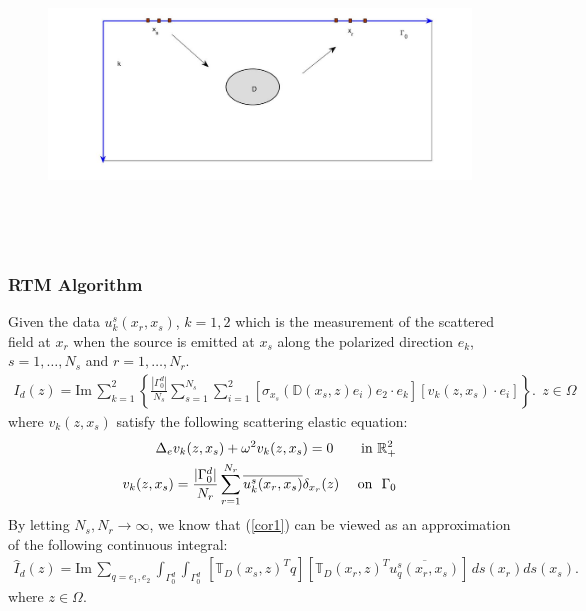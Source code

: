 \documentclass[utf-8,8pt]{beamer}
\newcommand{\R}{\mathbb{R}}
\renewcommand{\Im}{\mathrm{Im}\,}
\newcommand{\Ga}{\Gamma}
\newcommand{\Om}{\Omega}
\renewcommand{\Im}{\mathrm{Im}\,}
\newcommand{\D}{\mathbb{D}}
\newcommand{\T}{\mathbb{T}}
\newcommand{\be}{\begin{eqnarray}}
\newcommand{\ee}{\end{eqnarray}}
\newcommand{\ben}{\begin{eqnarray*}}
\newcommand{\een}{\end{eqnarray*}}
\begin{document}
\begin{frame}
\begin{figure}
  \centering
  \includegraphics[width=12cm,height=8cm]{./figure/half_forward}
\end{figure}
\end{frame}
\begin{frame}
\frametitle{RTM Algorithm}
Given the data $u_k^s(x_r,x_s)$, $k=1,2$ which is the measurement of the scattered field at $x_r$ when the source is emitted at $x_s$ along the  polarized direction $e_k$, $s=1,\dots, N_s$ and $r=1,\dots,N_r$.
\be\label{cor1}
I_d(z)=\Im\sum_{k=1}^{2}\left\{\frac{|\Gamma_0^d|}{N_s}\sum^{N_s}_{s=1}\sum_{i=1}^{2}[\sigma_{x_s}(\D(x_s,z)e_i)e_2\cdot e_k][v_k(z,x_s)\cdot e_i]\right\}. \ \ z\in \Omega
\ee
where $v_k(z,x_s)$ satisfy the following scattering elastic equation:
\ben
\Delta_e v_k(z,x_s) + \omega^2 v_k(z,x_s) =0 \qquad\mbox{\rm in } \R^2_+ \\
v_k(z,x_s)=\frac{|\Ga_0^d|}{N_r}\sum_{r=1}^{N_r}\overline{u^s_k(x_r,x_s)}\delta_{x_r}(z) \ \ \ \ \mbox{\rm on}  \ \ \Ga_0
\een
By letting $N_s,N_r\to\infty$, we know that (\ref{cor1}) can be viewed as an approximation of the following continuous integral:
\ben
\hat{I}_d(z)=\Im\sum_{q=e_1,e_2}\int_{\Gamma_0^d}\int_{\Gamma_0^d}\,
[\T_D(x_s,z)^Tq][\T_D(x_r,z)^T\overline{u^s_q(x_r,x_s)}]\,ds(x_r)ds(x_s).
\een
where $z\in\Om$.
\end{frame}
\end{document}
